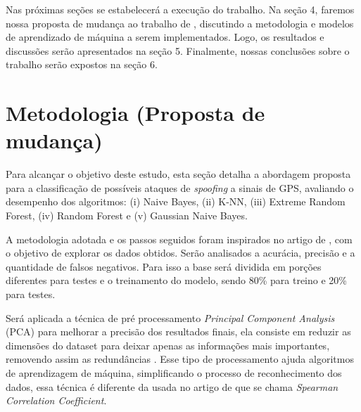 \documentclass[12pt]{article}
\begin{document}
Nas próximas seções se estabelecerá a execução do trabalho. Na seção 4, faremos 
nossa proposta de mudança ao trabalho de \cite{Aissou2021}, discutindo a 
metodologia e modelos de aprendizado de máquina a
serem implementados. Logo, os resultados e 
discussões serão apresentados na seção 5.
Finalmente, nossas conclusões sobre o trabalho serão expostos na seção 6.

\section{Metodologia (Proposta de mudança)}

Para alcançar o objetivo deste estudo,
esta seção detalha a abordagem proposta para a classificação
de possíveis ataques de \textit{spoofing} 
a sinais de GPS, avaliando o desempenho dos algoritmos:
(i) Naive Bayes, (ii) K-NN, (iii) Extreme Random Forest,
(iv) Random Forest e (v)  Gaussian Naive Bayes.

A metodologia adotada e os passos seguidos
foram inspirados no artigo de \cite{Aissou2021},
com o objetivo de explorar os dados obtidos.
Serão analisados a acurácia, 
precisão e a quantidade de falsos negativos. 
Para isso a base será dividida em porções
diferentes para testes e o treinamento do modelo,
sendo 80\% para treino e 20\% para testes. 

Será aplicada a técnica de pré processamento
\textit{Principal Component Analysis} (PCA) para melhorar
a precisão dos resultados finais, ela consiste em reduzir as
dimensões do dataset para deixar apenas as informações mais importantes,
removendo assim as redundâncias \cite{IBM02025}. 
Esse tipo de processamento ajuda algoritmos de aprendizagem de máquina,
simplificando o processo de reconhecimento dos dados, essa técnica é
diferente da usada no artigo de \cite{Aissou2021}
que se chama \textit{Spearman Correlation Coefficient}.


\printbibliography
\end{document}
